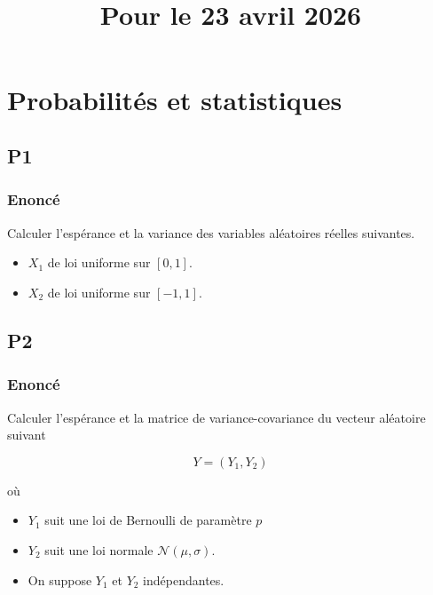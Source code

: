 \documentclass[
10pt, %
a4paper, %
oneside, %
headinclude,footinclude, %
BCOR5mm, %
]{scrartcl}
\title{\normalfont{FTML Exercices 1}\\
\large{Pour le 23 avril 2026}
}
\author{\spacedlowsmallcaps{}
}
\date{}
\begin{document}
\renewcommand{\sectionmark}[1]{\markright{\spacedlowsmallcaps{#1}}}
\lehead{\mbox{\llap{\small\thepage\kern1em\color{halfgray} \vline}\color{halfgray}\hspace{0.5em}\rightmark\hfil}} 
\pagestyle{scrheadings}
\maketitle 
\setcounter{tocdepth}{3} 

\tableofcontents


\section{\large\color{Blue}Probabilités et statistiques}

\subsection{\color{MidnightBlue}P1}

\subsubsection{Enoncé}
\label{par:enoncé}

Calculer l'espérance et la variance des variables aléatoires réelles suivantes.
\begin{itemize}
    \item $X_1$ de loi uniforme sur $[0, 1]$.
    \item $X_2$ de loi uniforme sur $[-1, 1]$.
\end{itemize}


\subsection{\color{MidnightBlue}P2}

\subsubsection{Enoncé}
\label{par:enoncé}

Calculer l'espérance et la matrice de variance-covariance du vecteur aléatoire suivant

\begin{equation}
    Y = (Y_1, Y_2)
\end{equation}

où
\begin{itemize}
    \item $Y_1$ suit une loi de Bernoulli de paramètre $p$
    \item $Y_2$ suit une loi normale $ \mathcal{N}(\mu, \sigma)$.
    \item On suppose $Y_1$ et $Y_2$ indépendantes.
\end{itemize}
\end{document}
